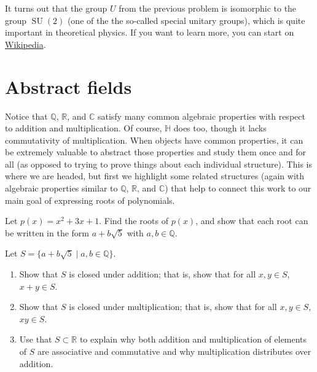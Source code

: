 It turns out that the group $U$ from the previous problem is isomorphic to the group $\operatorname{SU}(2)$ (one of the the so-called special unitary groups), which is quite important in theoretical physics. If you want to learn more, you can start on \href{https://en.wikipedia.org/wiki/Special_unitary_group#The_group_SU(2)}{Wikipedia}.

\section{Abstract fields}
Notice that $\mathbb{Q}$, $\mathbb{R}$, and $\mathbb{C}$ satisfy many common algebraic properties with respect to addition and multiplication. Of course, $\mathbb{H}$ does too, though it lacks commutativity of multiplication. When objects have common properties, it can be extremely valuable to abstract  those properties and study them once and for all (as opposed to trying to prove things about each individual structure). This is where we are headed, but first we highlight some related structures (again with algebraic properties similar to $\mathbb{Q}$, $\mathbb{R}$, and $\mathbb{C}$) that help to connect this work to our main goal of expressing roots of polynomials.

\begin{problem}
Let $p(x) = x^2+3x+1$. Find the roots of $p(x)$, and show that each root can be written in the form $a+b\sqrt{5}$ with $a,b\in \mathbb{Q}$.
\end{problem}

\begin{problem}\label{prob.QAdjoinRoot5Closure}
Let $S=\{a+b\sqrt{5}\mid a,b\in \mathbb{Q}\}$. 
\begin{enumerate}
\item Show that $S$ is closed under addition; that is, show that for all $x,y\in S$, $x+y\in S$.
\item Show that $S$ is closed under multiplication; that is, show that for all $x,y\in S$, $xy\in S$.
\item Use that $S\subset \mathbb{R}$ to explain why both addition and multiplication of elements of $S$ are associative and commutative and why multiplication distributes over addition.
\end{enumerate}
\end{problem}

